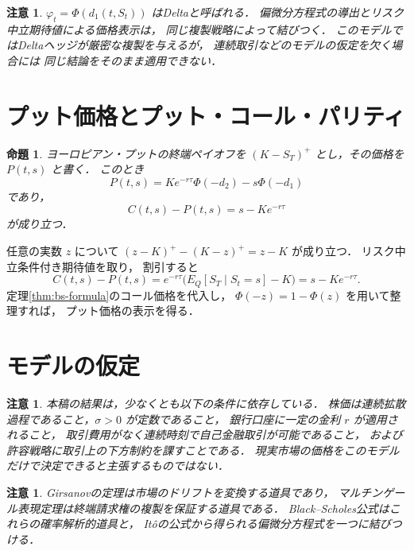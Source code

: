 \documentclass[a5paper,10pt,onecolumn]{jsarticle}
\makeatletter
\theoremstyle{mathnotetheorem}
\newtheorem{proposition}[theorem]{命題}
\newtheorem{remark}[theorem]{注意}
\renewcommand{\proofname}{証明}
\renewenvironment{proof}[1][\proofname]{%
  \par\pushQED{\qed}\normalfont\topsep4\p@\@plus2\p@\relax
  \trivlist\item[\hskip\labelsep\bfseries #1]\ignorespaces
}{\popQED\endtrivlist\@endpefalse}
\makeatother
\begin{document}
\begin{remark}
$\varphi_t=\Phi(d_1(t,S_t))$ はDeltaと呼ばれる．
偏微分方程式の導出とリスク中立期待値による価格表示は，
同じ複製戦略によって結びつく．
このモデルではDeltaヘッジが厳密な複製を与えるが，
連続取引などのモデルの仮定を欠く場合には
同じ結論をそのまま適用できない．
\end{remark}

\section{プット価格とプット・コール・パリティ}

\begin{proposition}\label{prop:put}
ヨーロピアン・プットの終端ペイオフを
$(K-S_T)^+$ とし，その価格を $P(t,s)$ と書く．
このとき
\[
 P(t,s)=Ke^{-r\tau}\Phi(-d_2)-s\Phi(-d_1)
\]
であり，
\[
 C(t,s)-P(t,s)=s-Ke^{-r\tau}
\]
が成り立つ．
\end{proposition}
\begin{proof}
任意の実数 $z$ について
$(z-K)^+-(K-z)^+=z-K$ が成り立つ．
リスク中立条件付き期待値を取り，
割引すると
\[
 C(t,s)-P(t,s)
 =e^{-r\tau}\bigl(E_Q[S_T\mid S_t=s]-K\bigr)
 =s-Ke^{-r\tau}.
\]
定理\ref{thm:bs-formula}のコール価格を代入し，
$\Phi(-z)=1-\Phi(z)$ を用いて整理すれば，
プット価格の表示を得る．
\end{proof}

\section{モデルの仮定}

\begin{remark}
本稿の結果は，少なくとも以下の条件に依存している．
株価は連続拡散過程であること，$\sigma>0$ が定数であること，
銀行口座に一定の金利 $r$ が適用されること，
取引費用がなく連続時刻で自己金融取引が可能であること，
および許容戦略に取引上の下方制約を課すことである．
現実市場の価格をこのモデルだけで決定できると主張するものではない．
\end{remark}

\begin{remark}
Girsanovの定理は市場のドリフトを変換する道具であり，
マルチンゲール表現定理は終端請求権の複製を保証する道具である．
Black--Scholes公式はこれらの確率解析的道具と，
It\^oの公式から得られる偏微分方程式を一つに結びつける．
\end{remark}
\end{document}
